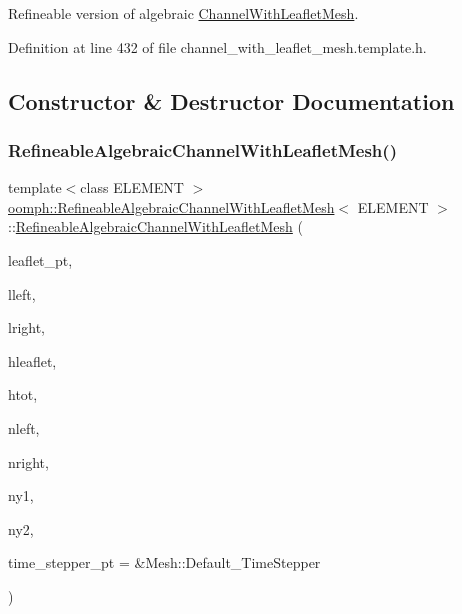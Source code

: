 Refineable version of algebraic \hyperlink{classoomph_1_1ChannelWithLeafletMesh}{Channel\+With\+Leaflet\+Mesh}. 

Definition at line 432 of file channel\+\_\+with\+\_\+leaflet\+\_\+mesh.\+template.\+h.



\subsection{Constructor \& Destructor Documentation}
\mbox{\label{classoomph_1_1RefineableAlgebraicChannelWithLeafletMesh_a6f67c948b27ed9350e57b2c92b573610}} 
\subsubsection{\texorpdfstring{Refineable\+Algebraic\+Channel\+With\+Leaflet\+Mesh()}{RefineableAlgebraicChannelWithLeafletMesh()}}
{\footnotesize\ttfamily template$<$class E\+L\+E\+M\+E\+NT $>$ \\
\hyperlink{classoomph_1_1RefineableAlgebraicChannelWithLeafletMesh}{oomph\+::\+Refineable\+Algebraic\+Channel\+With\+Leaflet\+Mesh}$<$ E\+L\+E\+M\+E\+NT $>$\+::\hyperlink{classoomph_1_1RefineableAlgebraicChannelWithLeafletMesh}{Refineable\+Algebraic\+Channel\+With\+Leaflet\+Mesh} (\begin{DoxyParamCaption}\item[{Geom\+Object $\ast$}]{leaflet\+\_\+pt,  }\item[{const double \&}]{lleft,  }\item[{const double \&}]{lright,  }\item[{const double \&}]{hleaflet,  }\item[{const double \&}]{htot,  }\item[{const unsigned \&}]{nleft,  }\item[{const unsigned \&}]{nright,  }\item[{const unsigned \&}]{ny1,  }\item[{const unsigned \&}]{ny2,  }\item[{Time\+Stepper $\ast$}]{time\+\_\+stepper\+\_\+pt = {\ttfamily \&Mesh\+:\+:Default\+\_\+TimeStepper} }\end{DoxyParamCaption})\hspace{0.3cm}{\ttfamily [inline]}}



